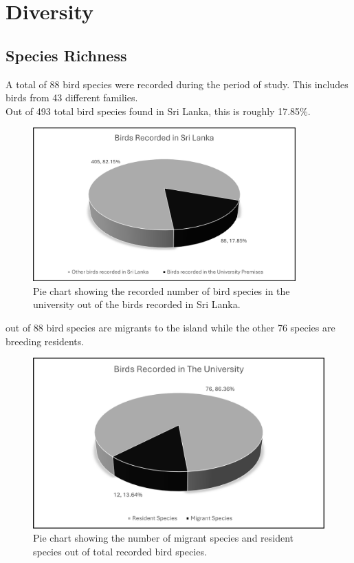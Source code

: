 \chapter{Diversity}
\label{cp:Diversity}

\section{Species Richness}
A total of 88 bird species were recorded during the period of study. This includes birds from 43 different families.\\
Out of 493 total bird species found in Sri Lanka, this is roughly 17.85\%.

\begin{figure}[!htpb]
    \centering
    \includegraphics[width=0.9\textwidth]{Figures/pieChart1.png}
    \caption[]{Pie chart showing the recorded number of bird species in the university out of the birds recorded in Sri Lanka.}
    \label{fig:figure-01}
\end{figure}
 out of 88 bird species are migrants to the island while the other 76 species are breeding residents. 

\begin{figure}[!htpb]
    \centering
    \includegraphics[width=\linewidth]{Figures/pieChart2.png}
    \caption[]{Pie chart showing the number of migrant species and resident species out of total recorded bird species.}
    \label{fig:figure-01}
\end{figure}
